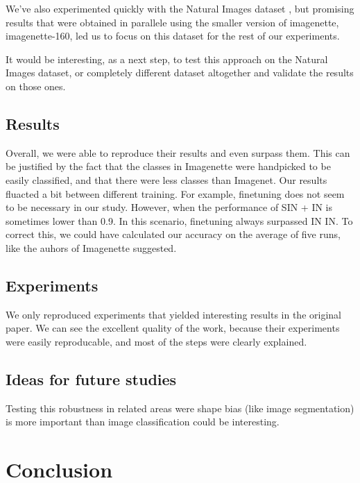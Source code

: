 \documentclass{article}
\begin{document}
\noindent
We've also experimented quickly with the Natural Images dataset \cite{natural-images}, 
but promising results that were obtained in parallele using the smaller version of imagenette, 
imagenette-160, led us to focus on this dataset for the rest of our experiments. \smallskip

\noindent
It would be interesting, as a next step, to test this approach on the Natural Images dataset,
or completely different dataset altogether and validate the results on those ones.


\subsection{Results}

Overall, we were able to reproduce their results and
even surpass them. This can be justified by the fact that the classes
in Imagenette were handpicked to be easily classified, and that there were less 
classes than Imagenet.
Our results fluacted a bit between different training. For example, finetuning does not seem to be necessary 
in our study. However, when the performance of SIN + IN is sometimes lower than 0.9. In this scenario, finetuning
always surpassed IN \texorpdfstring{\textrightarrow} .IN.
To correct this, we could have calculated our accuracy on the average of five runs, like the auhors of Imagenette \cite{fastai2019}
suggested.

\subsection{Experiments}

We only reproduced experiments that yielded interesting results 
in the original paper. We can see the excellent quality of the work, 
because their experiments were easily reproducable, and most of the 
steps were clearly explained.

\subsection{Ideas for future studies}

Testing this robustness in related areas were shape bias (like image segmentation) 
is more important than image classification could be interesting.

\section{Conclusion}
\end{document}
